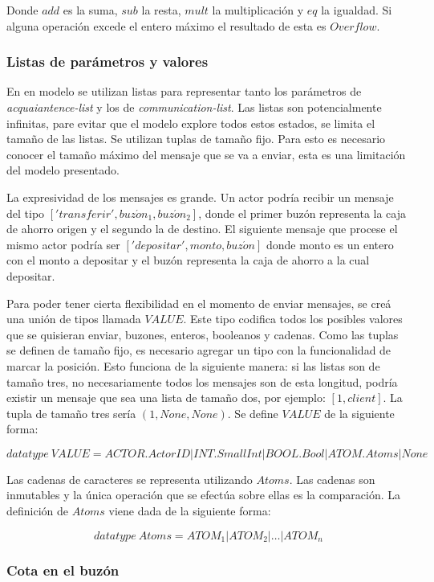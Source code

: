 Donde $add$ es la suma, $sub$ la resta, $mult$ la multiplicación y $eq$ la igualdad. Si alguna operación excede el entero máximo el resultado de esta es $Overflow$.

\subsubsection*{Listas de parámetros y valores}
En en modelo se utilizan listas para representar tanto los parámetros de \textit{acquaiantence-list} y los de \textit{communication-list}. Las listas son potencialmente infinitas, pare evitar que el modelo explore todos estos estados, se limita el tamaño de las listas. Se utilizan tuplas de tamaño fijo. Para esto es necesario conocer el tamaño máximo del mensaje que se va a enviar, esta es una limitación del modelo presentado.

La expresividad de los mensajes es grande. Un actor podría recibir un mensaje del tipo $['transferir', buz\acute{o}n_1, buz\acute{o}n_2]$, donde el primer buzón representa la caja de ahorro origen y el segundo la de destino. El siguiente mensaje que procese el mismo actor podría ser $['depositar', monto, buz\acute{o}n]$ donde monto es un entero con el monto a depositar y el buzón representa la caja de ahorro a la cual depositar. 

Para poder tener cierta flexibilidad en el momento de enviar mensajes, se creá una unión de tipos llamada $VALUE$. Este tipo codifica todos los posibles valores que se quisieran enviar, buzones, enteros, booleanos y cadenas. Como las tuplas se definen de tamaño fijo, es necesario agregar un tipo con la funcionalidad de marcar la posición. Esto funciona de la siguiente manera: si las listas son de tamaño tres, no necesariamente todos los mensajes son de esta longitud, podría existir un mensaje que sea una lista de tamaño dos, por ejemplo: $[1, client]$. La tupla de tamaño tres sería $(1, None, None)$. Se define $VALUE$ de la siguiente forma:

\[
  datatype\ VALUE = ACTOR.ActorID | INT.SmallInt | BOOL.Bool | ATOM.Atoms | None
\]

Las cadenas de caracteres se representa utilizando $Atoms$. Las cadenas son inmutables y la única operación que se efectúa sobre ellas es la comparación. La definición de $Atoms$ viene dada de la siguiente forma:

\[
  datatype\ Atoms = ATOM_1 | ATOM_2 | \ldots | ATOM_n
\]

\subsubsection*{Cota en el buzón}

